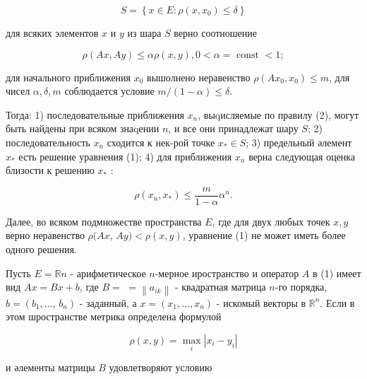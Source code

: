 \documentclass[10pt]{article}
\begin{document}
\[

S=\left\{x \in E: \rho\left(x, x_{0}\right) \leqslant \delta\right\}

\]



для всяких элементов $x$ и $y$ из шара $S$ верно соотношение



\[

\rho(A x, A y) \leqslant \alpha \rho(x, y), 0<\alpha=\text { const }<1 ;

\]



для начального приближения $x_{0}$ вышолнено неравенство $\rho\left(A x_{0}, x_{0}\right) \leqslant m$, для чисел $\alpha, \delta, m$ соблюдается условие $m /(1-\alpha) \leqslant \delta$.



Тогда: 1) последовательные приближения $x_{n}$, выqисляемые по правилу (2), могут быть найдены при всяком знаqении $n$, и все они принадлежат шару $S$; 2) последовательность $x_{n}$ сходится к нек-рой точке $x_{*} \in S$; 3) предельный әлемент $x_{*}$ есть решение уравнения (1); 4) для приближения $x_{n}$ верна следующая оценка близости к решению $x_{*}$ :



\[

\rho\left(x_{n}, x_{*}\right) \leqslant \frac{m}{1-\alpha} \alpha^{n} .

\]



Далее, во всяком подмножестве пространства $E$, где для двух любых точек $x, y$ верно неравенство $\rho(A x$, $A y)<\rho(x, y)$, уравнение (1) не может иметь более одного решения.



Пусть $E=\mathbb{R} n$ - арифметическое $n$-мерное иространство и оператор $A$ в (1) имеет вид $A x=B x+b$, где $B=$ $=\left\|a_{i k}\right\|$ - квадратная матрица $n$-го порядка, $b=\left(b_{1}, \ldots\right.$, $\left.b_{n}\right)$ - заданный, а $x=\left(x_{1}, \ldots, x_{n}\right)$ - искомый векторы в $\mathbb{R}^{n}$. Если в этом шространстве метрика определена формулой



\[

\rho(x, y)=\max _{i}\left|x_{i}-y_{i}\right|

\]



и әлементы матрицы $B$ удовлетворяют условию
\end{document}
